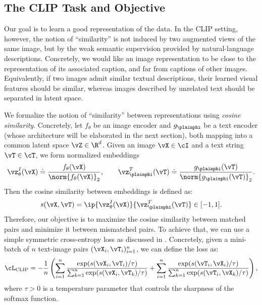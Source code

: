 \documentclass[../../book-main.tex]{subfiles}
\begin{document}
\subsection{The CLIP Task and Objective}
Our goal is to learn a good representation of the data.
In the CLIP setting, however, the notion of ``similarity'' is not induced by two augmented views of the same image, but by the weak semantic supervision provided by natural-language descriptions.
Concretely, we would like an image representation to be close to the representation of its associated caption, and far from captions of other images.
Equivalently, if two images admit similar textual descriptions, their learned visual features should be similar, whereas images described by unrelated text should be separated in latent space.

We formalize the notion of ``similarity'' between representations using \textit{cosine similarity}.
Concretely, let \(f_{\theta}\) be an image encoder and \(g_{\plainphi}\) be a text encoder (whose architecture will be elaborated in the next section), both mapping into a common latent space \(\vZ \in \R^{d}\).
Given an image \(\vX \in \cI\) and a text string \(\vT \in \cT\), we form normalized embeddings
\begin{equation}
    \vz^{I}_{\theta}(\vX) \doteq \frac{f_{\theta}(\vX)}{\norm{f_{\theta}(\vX)}_{2}},
    \qquad
    \vz^{T}_{\plainphi}(\vT) \doteq \frac{g_{\plainphi}(\vT)}{\norm{g_{\plainphi}(\vT)}_{2}} .
\end{equation}
Then the cosine similarity between embeddings is defined as:
\begin{equation}
    s(\vX, \vT)
    =
    \ip{\vz^{I}_{\theta}(\vX)}{\vz^{T}_{\plainphi}(\vT)}
    \in [-1, 1] .
\end{equation}
Therefore, our objective is to maximize the cosine similarity between matched pairs and minimize it between mismatched pairs.
To achieve that, we can use a simple symmetric cross-entropy loss as discussed in .
Concretely, given a mini-batch of \(n\) text-image pairs \((\vX_{i}, \vT_{i})_{i=1}^{n}\), we can define the loss as:
\begin{equation}\label{eq:practical_clip_loss}
    \cL_{\mathrm{CLIP}} = -\frac{1}{n}\left(
    \sum_{i=1}^{n}
    \frac{\exp(s(\vX_{i}, \vT_{i})/\tau)}{\sum_{k=1}^{n}\exp(s(\vX_{i}, \vT_{k})/\tau)}
    +
    \sum_{i=1}^{n}
    \frac{\exp(s(\vT_{i}, \vX_{i})/\tau)}{\sum_{k=1}^{n}\exp(s(\vT_{i}, \vX_{k})/\tau)}
    \right) ,
\end{equation}
where \(\tau > 0\) is a temperature parameter that controls the sharpness of the softmax function.
\end{document}
